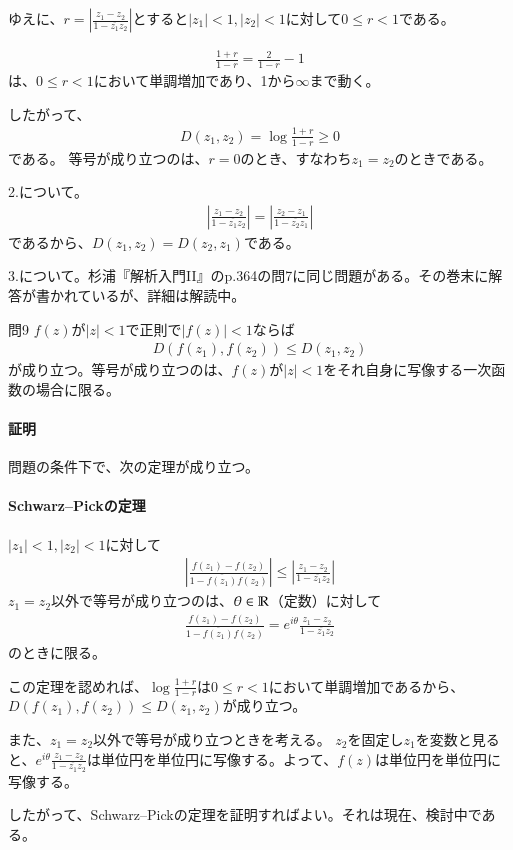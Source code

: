 ゆえに、$r=\left|\frac{z_1-z_2}{1-\overline{z_1}z_2}\right|$とすると$|z_1|<1, |z_2|<1$に対して$0\le r<1$である。

\begin{align*}
    \frac{1+r}{1-r}
    =\frac{2}{1-r}-1
\end{align*}
は、$0\le r<1$において単調増加であり、1から$\infty$まで動く。

したがって、
\begin{align*}
    D(z_1,z_2)=\log\frac{1+r}{1-r}\ge0
\end{align*}
である。
等号が成り立つのは、$r=0$のとき、すなわち$z_1=z_2$のときである。

2.について。
\begin{align*}
    \left|\frac{z_1-z_2}{1-\overline{z_1}z_2}\right|
    =\left|\frac{z_2-z_1}{1-\overline{z_2}z_1}\right|
\end{align*}
であるから、$D(z_1,z_2)=D(z_2,z_1)$である。

3.について。杉浦『解析入門II』のp.364の問7に同じ問題がある。その巻末に解答が書かれているが、詳細は解読中。

\newpage
\begin{mysimplebox}{問9}
    $f(z)$が$|z|<1$で正則で$|f(z)|<1$ならば
    \begin{align*}
        D(f(z_1),f(z_2))\le D(z_1,z_2)
    \end{align*}
    が成り立つ。等号が成り立つのは、$f(z)$が$|z|<1$をそれ自身に写像する一次函数の場合に限る。
\end{mysimplebox}
\paragraph{証明}
問題の条件下で、次の定理が成り立つ。

\paragraph{Schwarz--Pickの定理}
$|z_1|<1, |z_2|<1$に対して
\begin{align*}
    \left|\frac{f(z_1)-f(z_2)}{1-\overline{f(z_1)}f(z_2)}\right|
    \le\left|\frac{z_1-z_2}{1-\overline{z_1}z_2}\right|
\end{align*}
$z_1=z_2$以外で等号が成り立つのは、$\theta\in\mathbb{R}$（定数）に対して
\begin{align*}
    \frac{f(z_1)-f(z_2)}{1-\overline{f(z_1)}f(z_2)}=e^{i\theta}\frac{z_1-z_2}{1-\overline{z_1}z_2}
\end{align*}
のときに限る。

この定理を認めれば、$\log\frac{1+r}{1-r}$は$0\le r<1$において単調増加であるから、
$D(f(z_1),f(z_2))\le D(z_1,z_2)$が成り立つ。

また、$z_1=z_2$以外で等号が成り立つときを考える。
$z_2$を固定し$z_1$を変数と見ると、$e^{i\theta}\frac{z_1-z_2}{1-\overline{z_1}z_2}$は単位円を単位円に写像する。よって、$f(z)$は単位円を単位円に写像する。

したがって、Schwarz--Pickの定理を証明すればよい。それは現在、検討中である。